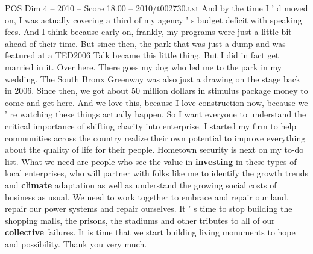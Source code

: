 \begin{textsample}{POS Dim 4 – 2010 – Score 18.00 – 2010/t002730.txt}
And by the time I ' d moved on, I was actually covering a third of my agency ' s budget deficit with speaking fees.
And I think because early on, frankly, my programs were just a little bit ahead of their time.
But since then, the park that was just a dump and was featured at a TED2006 Talk became this little thing.
But I did in fact get married in it.
Over here.
There goes my dog who led me to the park in my wedding.
The South Bronx Greenway was also just a drawing on the stage back in 2006.
Since then, we got about 50 million dollars in stimulus package money to come and get here.
And we love this, because I love construction now, because we ' re watching these things actually happen.
So I want everyone to understand the critical importance of shifting charity into enterprise.
I started my firm to help communities across the country realize their own potential to improve everything about the quality of life for their people.
Hometown security is next on my to-do list.
What we need are people who see the value in \textbf{investing} in these types of local enterprises, who will partner with folks like me to identify the growth trends and \textbf{climate} adaptation as well as understand the growing social costs of business as usual.
We need to work together to embrace and repair our land, repair our power systems and repair ourselves.
It ' s time to stop building the shopping malls, the prisons, the stadiums and other tributes to all of our \textbf{collective} failures.
It is time that we start building living monuments to hope and possibility.
Thank you very much.

\end{textsample}
